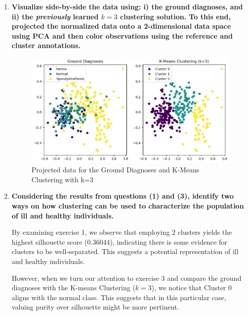 \documentclass[12pt]{article}
\begin{document}
\begin{enumerate}[leftmargin=\labelsep]
\begin{enumerate}
        \end{enumerate}

  \item \textbf{Visualize side-by-side the data using: i) the ground diagnoses, and ii) the \textit{previously} learned
          $k = 3$ clustering solution. To this end, projected the normalized data onto a 2-dimensional data
          space using PCA and then color observations using the reference and cluster annotations.}

        \vskip 0.3cm
        

        \begin{figure}[H]
          \centering
          \includegraphics[width=18cm]{./assets/exII3-plot.png}
          \caption{Projected data for the Ground Diagnoses and K-Means Clustering with k=3}
          \label{fig:PartII-ex3}
        \end{figure}

  \item \textbf{Considering the results from questions (1) and (3), identify two ways on how clustering can
          be used to characterize the population of ill and healthy individuals.}

        \vskip 0.3cm
        By examining exercise 1, we observe that employing 2 clusters yields the highest silhouette score ($0.36044$),
        indicating there is some evidence for clusters to be well-separated. This suggests a potential representation of ill and healthy individuals.

        However, when we turn our attention to exercise 3 and compare the ground diagnoses with the K-means Clustering ($k=3$),
        we notice that Cluster 0 aligns with the normal class. This suggests that in this particular case, valuing purity over silhouette might be more pertinent.


\end{enumerate}
\end{document}
